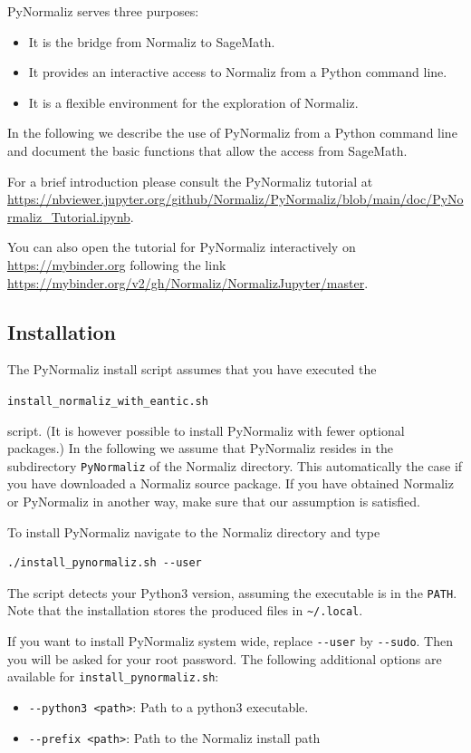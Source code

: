 \begin{small}
	
PyNormaliz serves three purposes:
\begin{itemize}
	\item It is the bridge from Normaliz to SageMath.
	\item It provides an interactive access to Normaliz from a Python command line.
	\item It is a flexible environment for the exploration of Normaliz.
\end{itemize}
In the following we describe the use of PyNormaliz from a Python command line and document the basic functions that allow the access from SageMath.

For a brief introduction please consult the PyNormaliz tutorial at \url{https://nbviewer.jupyter.org/github/Normaliz/PyNormaliz/blob/main/doc/PyNormaliz_Tutorial.ipynb}.

You can also open the tutorial for PyNormaliz interactively on \url{https://mybinder.org} following the link \url{https://mybinder.org/v2/gh/Normaliz/NormalizJupyter/master}.

\subsection{Installation}

The PyNormaliz install script assumes that you have executed the
\begin{center}
	\verb|install_normaliz_with_eantic.sh|
\end{center}
script. (It is however possible to install PyNormaliz with fewer optional packages.) In the following we assume that PyNormaliz resides in the subdirectory \verb|PyNormaliz| of the Normaliz directory. This automatically the case if you have downloaded a Normaliz source package. If you have obtained Normaliz or PyNormaliz in another way, make sure that our assumption is satisfied.

To install PyNormaliz navigate to the Normaliz directory and type
\begin{Verbatim}
./install_pynormaliz.sh --user
\end{Verbatim}
The script detects your Python3 version, assuming the executable is in the \verb|PATH|. Note that the installation stores the produced files in \verb|~/.local|.

If you want to install PyNormaliz system wide,
replace \verb|--user| by \verb|--sudo|. Then you will be asked for your root password.
The following additional options are available for \verb|install_pynormaliz.sh|:
\begin{itemize}
	\item \verb|--python3 <path>|: Path to a python3 executable.
	\item \verb|--prefix <path>|: Path to the Normaliz install path
\end{itemize}


\end{small}
